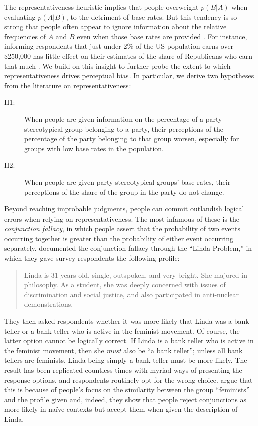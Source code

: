 \documentclass[12pt, letterpaper]{article}
\begin{document}
The representativeness heuristic implies that people overweight $p(B|A)$ when evaluating $p(A|B)$, to the detriment of base rates. But this tendency is so strong that people often appear to ignore information about the relative frequencies of $A$ and $B$ even when those base rates are provided \citep{KahnemanFrederick2002}. For instance, informing respondents that just under 2\% of the US population earns over \$250,000 has little effect on their estimates of the share of Republicans who earn that much \citep{ahler2018parties,ahler2017}. We build on this insight to further probe the extent to which representativeness drives perceptual bias. In particular, we derive two hypotheses from the literature on representativeness: 

\begin{description}
\item[H1:] When people are given information on the percentage of a party-stereotypical group belonging to a party, their perceptions of the percentage of the party belonging to that group worsen, especially for groups with low base rates in the population.
\item[H2:] When people are given party-stereotypical groups' base rates, their perceptions of the share of the group in the party do not change.
\end{description} 

Beyond reaching improbable judgments, people can commit outlandish logical errors when relying on representativeness. The most infamous of these is the \emph{conjunction fallacy}, in which people assert that the probability of two events occurring together is greater than the probability of either event occurring separately. \citet{tversky1983extension} documented the conjunction fallacy through the ``Linda Problem,'' in which they gave survey respondents the following profile:
\begin{quotation}
\noindent Linda is 31 years old, single, outspoken, and very bright. She majored in philosophy. As a student, she was deeply concerned with issues of discrimination and social justice, and also participated in anti-nuclear demonstrations.
\end{quotation}

\noindent They then asked respondents whether it was more likely that Linda was a bank teller or a bank teller who is active in the feminist movement. Of course, the latter option cannot be logically correct. If Linda is a bank teller who is active in the feminist movement, then she \emph{must} also be ``a bank teller''; unless all bank tellers are feminists, Linda being simply a bank teller must be more likely. The result has been replicated countless times with myriad ways of presenting the response options, and respondents routinely opt for the wrong choice. \citeauthor{tversky1983extension} argue that this is because of people's focus on the similarity between the group ``feminists'' and the profile given and, indeed, they show that people reject conjunctions as more likely in na\"{i}ve contexts but accept them when given the description of Linda. 
\end{document}
